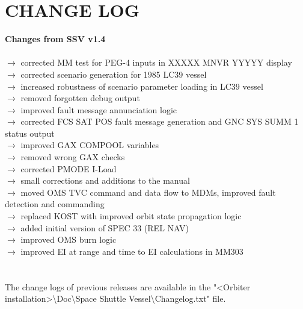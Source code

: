 \documentclass[Space_Shuttle_Vessel_Manual.tex]{subfiles}
\begin{document}
\section{CHANGE LOG}
\label{sec:change-log}
\noindent
\textbf{Changes from SSV v1.4}\\\\
$\rightarrow$ corrected MM test for PEG-4 inputs in XXXXX MNVR YYYYY display\\
$\rightarrow$ corrected scenario generation for 1985 LC39 vessel\\
$\rightarrow$ increased robustness of scenario parameter loading in LC39 vessel\\
$\rightarrow$ removed forgotten debug output\\
$\rightarrow$ improved fault message annunciation logic\\
$\rightarrow$ corrected FCS SAT POS fault message generation and GNC SYS SUMM 1 status output\\
$\rightarrow$ improved GAX COMPOOL variables\\
$\rightarrow$ removed wrong GAX checks\\
$\rightarrow$ corrected PMODE I-Load\\
$\rightarrow$ small corrections and additions to the manual\\
$\rightarrow$ moved OMS TVC command and data flow to MDMs, improved fault detection and commanding\\
$\rightarrow$ replaced KOST with improved orbit state propagation logic\\
$\rightarrow$ added initial version of SPEC 33 (REL NAV)\\
$\rightarrow$ improved OMS burn logic\\
$\rightarrow$ improved EI at range and time to EI calculations in MM303\\
\\
\\
The change logs of previous releases are available in the "<Orbiter installation>\textbackslash Doc\textbackslash Space Shuttle Vessel\textbackslash Changelog.txt" file.
\end{document}

